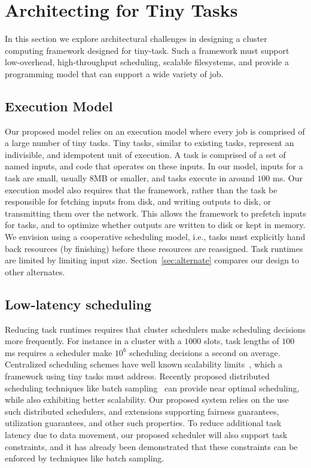 \section{Architecting for Tiny Tasks}
In this section we explore architectural challenges in designing a cluster
computing framework designed for tiny-task. Such a framework must support
low-overhead, high-throughput scheduling, scalable filesystems, and provide
a programming model that can support a wide variety of job.

\subsection{Execution Model}
Our proposed model relies on an execution model where every job is comprised of
a large number of tiny tasks. Tiny tasks, similar to existing tasks, represent an
indivisible, and idempotent unit of execution. A task is comprised of a set of named
inputs, and code that operates on these inputs. In our
model, inputs for a task are small, usually $8$MB or smaller, and tasks execute in
around $100$ ms. Our execution model also requires that the framework, rather than the
task be responsible for fetching inputs from disk, and writing outputs to disk, or transmitting
them over the network. This allows the framework to prefetch inputs for tasks, and
to optimize whether outputs are written to disk or kept in memory. We envision using
a cooperative scheduling model, i.e., tasks must explicitly hand back resources (by finishing)
before these resources are reassigned. Task runtimes are limited by limiting input size.
Section~\ref{sec:alternate} compares our design to other alternates.

\subsection{Low-latency scheduling}
Reducing task runtimes requires that cluster schedulers make scheduling decisions more frequently.
For instance in a cluster with a $1000$ slots, task lengths of $100$ ms requires a scheduler make
$10^6$ scheduling decisions a second on average. Centralized scheduling schemes have well known
scalability limits~\cite{wilkesberkeley}, which a framework using tiny tasks must address. Recently
proposed distributed scheduling techniques like batch sampling~\cite{ousterhoutbatch} can provide
near optimal scheduling, while also exhibiting better scalability. Our proposed system relies
on the use such distributed schedulers, and extensions supporting fairness guarantees, utilization
guarantees, and other such properties. To reduce additional task latency due to data movement, our
proposed scheduler will also support task constraints, and it has already been demonstrated that
these constraints can be enforced by techniques like batch sampling. 

